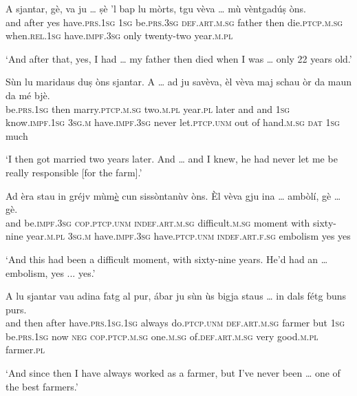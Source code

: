 \begin{linenumbers}
\gll    A sjantar, gè, va ju … ṣè 'l bap lu mòrts, tgu vèva … mù vèntgadúṣ òns.\\
and after yes have.\textsc{prs.1sg} \textsc{1sg} {} be.\textsc{prs.3sg} \textsc{def.art.m.sg} father then die.\textsc{ptcp.m.sg} when.\textsc{rel.1sg} have.\textsc{impf.3sg} {} only twenty-two year.\textsc{m.pl}\\
\end{linenumbers}
\medskip
\glt `And after that, yes, I had … my father then died when I was … only 22 years old.'
\medskip

\begin{linenumbers}
\gll    Sùn lu maridaus duṣ òns sjantar. A … ad ju savèva, èl vèva maj schau òr da maun da mé bjè.\\
be.\textsc{prs.1sg} then marry.\textsc{ptcp.m.sg} two.\textsc{m.pl} year.\textsc{pl} later and {} and \textsc{1sg} know.\textsc{impf.1sg} \textsc{3sg.m} have.\textsc{impf.3sg} never let.\textsc{ptcp.unm} out of hand.\textsc{m.sg} \textsc{dat} \textsc{1sg} much\\
\end{linenumbers}
\medskip
\glt `I then got married two years later. And … and I knew, he had never let me be really responsible [for the farm].'
\medskip

\begin{linenumbers}
\gll    Ad èra stau in gréjv mùm\underline{è} cun sissòntanùv òns. Èl vèva gju ina … ambòlí, gè … gè.\\
and be.\textsc{impf.3sg} \textsc{cop.ptcp.unm} \textsc{indef.art.m.sg} difficult.\textsc{m.sg} moment with sixty-nine year.\textsc{m.pl} \textsc{3sg.m} have.\textsc{impf.3sg} have.\textsc{ptcp.unm} \textsc{indef.art.f.sg} {} embolism yes {} yes\\
\end{linenumbers}
\medskip
\glt `And this had been a difficult moment, with sixty-nine years. He’d had an … embolism, yes ... yes.'
\medskip

\begin{linenumbers}
\gll    A lu sjantar vau adina fatg al pur, ábar ju sùn ùs bigja staus … in dals fétg buns purs.\\
and then after have.\textsc{prs.1sg.1sg} always do.\textsc{ptcp.unm} \textsc{def.art.m.sg} farmer but  \textsc{1sg} be.\textsc{prs.1sg} now \textsc{neg} \textsc{cop.ptcp.m.sg} {} one.\textsc{m.sg} of.\textsc{def.art.m.sg} very good.\textsc{m.pl} farmer.\textsc{pl}\\
\end{linenumbers}
\medskip
\glt `And since then I have always worked as a farmer, but I’ve never been … one of the best farmers.'
\medskip

